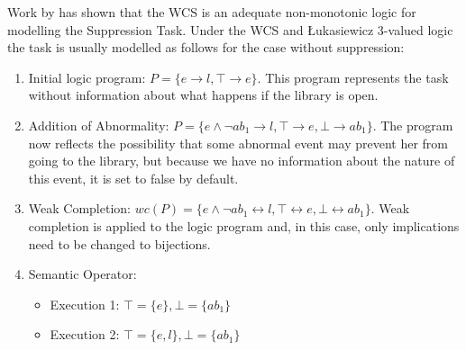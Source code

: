 \documentclass{article}
\begin{document}
Work by \cite{dietz2014modeling} has shown that the WCS is an adequate non-monotonic logic for modelling the Suppression Task. Under the WCS and \L ukasiewicz 3-valued logic the task is usually modelled as follows for the case without suppression:
\begin{enumerate}
\item Initial logic program: $P = \{e \rightarrow l, \top \rightarrow e \}$. This program represents the task without information about what happens if the library is open.
\item Addition of Abnormality: $P = \{e \land \lnot ab_1 \rightarrow l, \top \rightarrow e, \bot \rightarrow ab_1 \}$. The program now reflects the possibility that some abnormal event may prevent her from going to the library, but because we have no information about the nature of this event, it is set to false by default.
\item Weak Completion: $wc(P) = \{e \land \lnot ab_1 \leftrightarrow l, \top \leftrightarrow e, \bot \leftrightarrow ab_1 \}$. Weak completion is applied to the logic program and, in this case, only implications need to be changed to bijections.
\item Semantic Operator:
\begin{itemize}
\item Execution 1: $\top=\{e\}, \bot=\{ab_1\}$
\item Execution 2: $\top=\{e,l\}, \bot=\{ab_1\}$
\end{itemize}
\end{enumerate}
\end{document}
